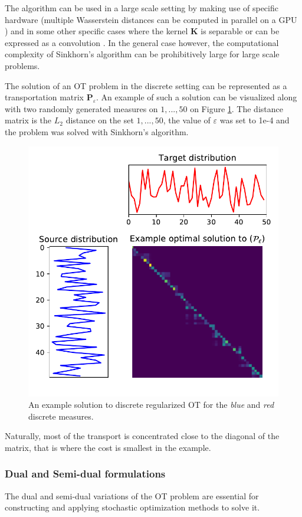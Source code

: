 The algorithm can be used in a large scale setting by making use of specific hardware (multiple Wasserstein distances can be computed in parallel on a GPU \cite{slomp2011gpu}) and in some other specific cases where the kernel $\mathbf{K}$ is separable or can be expressed as a convolution \cite{peyre_computational_2018}. In the general case however, the computational complexity of Sinkhorn's algorithm can be prohibitively large for large scale problems.

The solution of an OT problem in the discrete setting can be represented as a transportation matrix $\mathbf{P}_\varepsilon$. An example of such a solution can be visualized along with two randomly generated measures on ${1, ..., 50}$ on Figure \ref{fig:example_discrete}. The distance matrix is the $L_2$ distance on the set ${1, ..., 50}$, the value of $\varepsilon$ was set to 1e-4 and the problem was solved with Sinkhorn's algorithm.

\begin{figure}[h]
    \centering
    \includegraphics[width=0.4\linewidth]{figures/example_discrete.pdf}
    \caption{An example solution to discrete regularized OT for the \emph{blue} and \emph{red} discrete measures.}
    \label{fig:example_discrete}
\end{figure}

Naturally, most of the transport is concentrated close to the diagonal of the matrix, that is where the cost is smallest in the example.

\subsubsection{Dual and Semi-dual formulations}
The dual and semi-dual variations of the OT problem are essential for constructing and applying stochastic optimization methods to solve it.

